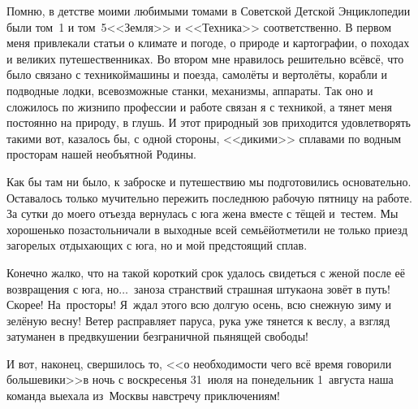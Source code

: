 Помню, в детстве моими любимыми томами в Советской Детской Энциклопедии были том~1 и том~5\mdash <<Земля>> и <<Техника>> соответственно. В первом меня привлекали статьи о климате и погоде, о природе и картографии, о походах и великих путешественниках. Во втором мне нравилось решительно всё\mdash всё, что было связано с техникой\mdash машины и поезда, самолёты и вертолёты, корабли и подводные лодки, всевозможные станки, механизмы, аппараты. Так оно и сложилось по жизни\mdash по профессии и работе связан я с техникой, а тянет меня постоянно на природу, в глушь. И этот природный зов приходится удовлетворять такими вот, казалось бы, с одной стороны, <<дикими>> сплавами по водным просторам нашей необъятной Родины.

Как бы там ни было, к заброске и путешествию мы подготовились основательно. Оставалось только мучительно пережить последнюю рабочую пятницу на работе. За сутки до моего отъезда вернулась с юга жена вместе с тёщей и~тестем. Мы хорошенько позастольничали в выходные всей семьёй\mdash отметили не только приезд загорелых отдыхающих с юга, но и мой предстоящий сплав. 

Конечно жалко, что на такой короткий срок удалось свидеться с женой после её возвращения с юга, но$\ldots$~заноза странствий страшная штука\mdash она зовёт в путь! Скорее! На~просторы! Я~ждал этого всю долгую осень, всю снежную зиму и зелёную весну! Ветер расправляет паруса, рука уже тянется к веслу, а взгляд затуманен в предвкушении безграничной пьянящей свободы!

И вот, наконец, свершилось то, <<о необходимости чего всё время говорили большевики>>\mdash  в ночь с воскресенья 31~июля на понедельник 1~августа наша команда выехала из~Москвы навстречу приключениям!

\begin{center}
\end{center}

